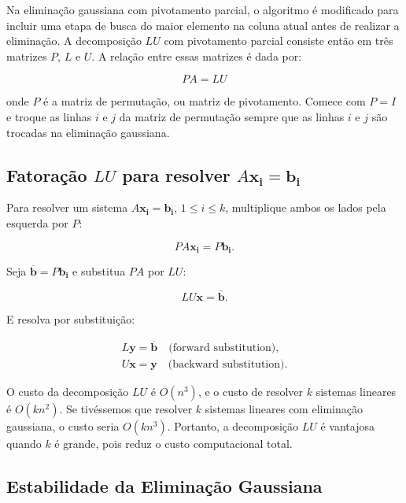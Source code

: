 \documentclass{article}
\theoremstyle{plain}
\theoremstyle{definition}
\theoremstyle{remark}
\begin{document}
Na eliminação gaussiana com pivotamento parcial, o algoritmo é modificado para incluir uma etapa de busca do maior elemento na coluna atual antes de realizar a eliminação. A decomposição \(LU\) com pivotamento parcial consiste então em três matrizes \(P\), \(L\) e \(U\). A relação entre essas matrizes é dada por:

\begin{equation}
  PA = LU
\end{equation}

\noindent onde \(P\) é a matriz de permutação, ou matriz de pivotamento. Comece com \(P = I\) e troque as linhas \(i\) e \(j\) da matriz de permutação sempre que as linhas \(i\) e \(j\) são trocadas na eliminação gaussiana.

\subsection{Fatoração \(LU\) para resolver \(A\mathbf{x_i} = \mathbf{b_i}\)}

Para resolver um sistema \(A\mathbf{x_i} = \mathbf{b_i}\), \(1 \leq i \leq k\), multiplique ambos os lados pela esquerda por \(P\):

\begin{equation}
  PA\mathbf{x_i} = P\mathbf{b_i}.  
\end{equation}

Seja \(\overline{\mathbf{b}} = P\mathbf{b_i}\) e substitua \(PA\) por \(LU\):

\begin{equation}
  LU\mathbf{x} = \overline{\mathbf{b}}.
\end{equation}

E resolva por substituição:

\begin{align}
  L\mathbf{y} = \overline{\mathbf{b}} \quad \text{(forward substitution)},\\
  U\mathbf{x} = \mathbf{y} \quad \text{(backward substitution)}.
\end{align}

O custo da decomposição \(LU\) é \(O(n^3)\), e o custo de resolver \(k\) sistemas lineares é \(O(kn^2)\). Se tivéssemos que resolver \(k\) sistemas lineares com eliminação gaussiana, o custo seria \(O(kn^3)\). Portanto, a decomposição \(LU\) é vantajosa quando \(k\) é grande, pois reduz o custo computacional total.

\subsection{Estabilidade da Eliminação Gaussiana}
\end{document}
